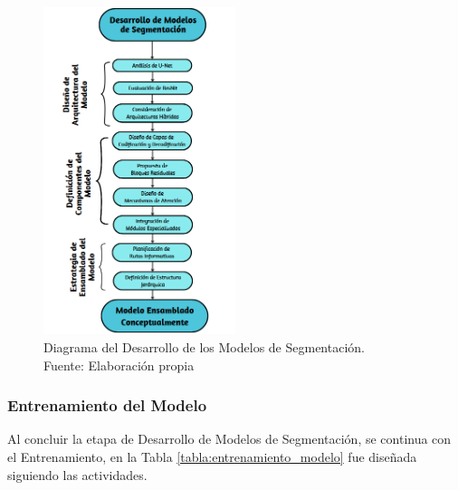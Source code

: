  
 \begin{figure}[h]
    \begin{center}
        \includegraphics[width=0.5\textwidth]{3/figures/Diagrama de Desarrollo.png}
        \caption[Diagrama del Desarrollo de los Modelos de Segmentación]{Diagrama del Desarrollo de los Modelos de Segmentación.\\
        Fuente: Elaboración propia}
        \label{3:fig5}
    \end{center}
\end{figure}

\subsubsection{Entrenamiento del Modelo}
Al concluir la etapa de Desarrollo de Modelos de Segmentación, se continua con el Entrenamiento, en la Tabla \ref{tabla:entrenamiento_modelo} fue diseñada siguiendo las actividades.


